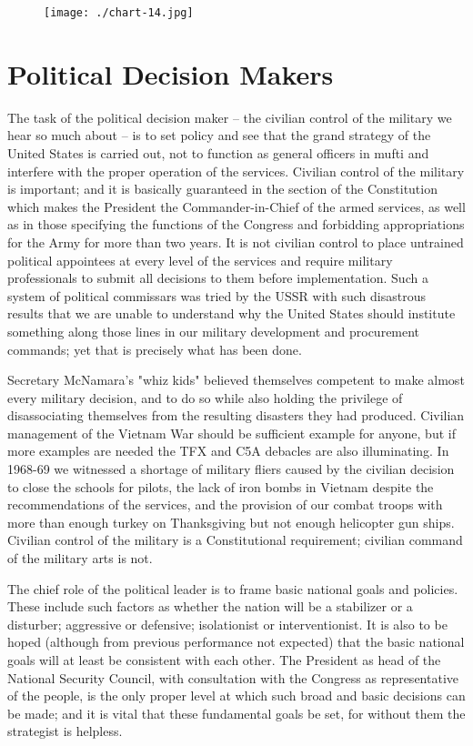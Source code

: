 \begin{figure}[h!]
    \texttt{[image: ./chart-14.jpg]}
    \label{fig:chart-14}
\end{figure}

\section{Political Decision Makers}
The task of the political decision maker -- the civilian control of the military we hear so much about -- is to set policy and see that the grand strategy of the United States is carried out, not to function as general officers in mufti and interfere with the proper operation of the services. Civilian control of the military is important; and it is basically guaranteed in the section of the Constitution which makes the President the Commander-in-Chief of the armed services, as well as in those specifying the functions of the Congress and forbidding appropriations for the Army for more than two years. It is not civilian control to place untrained political appointees at every level of the services and require military professionals to submit all decisions to them before implementation. Such a system of political commissars was tried by the USSR with such disastrous results that we are unable to understand why the United States should institute something along those lines in our military development and procurement commands; yet that is precisely what has been done.

Secretary McNamara's "whiz kids" believed themselves competent to make almost every military decision, and to do so while also holding the privilege of disassociating themselves from the resulting disasters they had produced. Civilian management of the Vietnam War should be sufficient example for anyone, but if more examples are needed the TFX and C5A debacles are also illuminating. In 1968-69 we witnessed a shortage of military fliers caused by the civilian decision to close the schools for pilots, the lack of iron bombs in Vietnam despite the recommendations of the services, and the provision of our combat troops with more than enough turkey on Thanksgiving but not enough helicopter gun ships. Civilian control of the military is a Constitutional requirement; civilian command of the military arts is not.

The chief role of the political leader is to frame basic national goals and policies. These include such factors as whether the nation will be a stabilizer or a disturber; aggressive or defensive; isolationist or interventionist. It is also to be hoped (although from previous performance not expected) that the basic national goals will at least be consistent with each other. The President as head of the National Security Council, with consultation with the Congress as representative of the people, is the only proper level at which such broad and basic decisions can be made; and it is vital that these fundamental goals be set, for without them the strategist is helpless.

